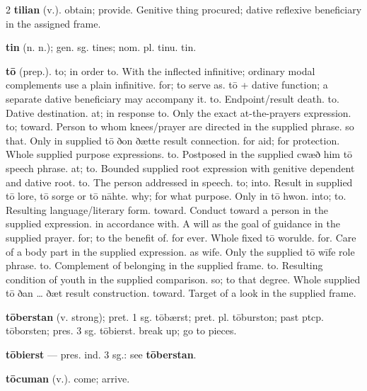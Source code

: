 \begin{multicols*}{2}
\textbf{tilian} (v.). obtain; provide. Genitive thing procured; dative reflexive beneficiary in the assigned frame.\par
\textbf{tin} (n. n.); gen. sg. tines; nom. pl. tinu. tin.\par
\textbf{tō} (prep.). to; in order to. With the inflected infinitive; ordinary modal complements use a plain infinitive. for; to serve as. tō + dative function; a separate dative beneficiary may accompany it. to. Endpoint/result death. to. Dative destination. at; in response to. Only the exact at-the-prayers expression. to; toward. Person to whom knees/prayer are directed in the supplied phrase. so that. Only in supplied tō ðon ðætte result connection. for aid; for protection. Whole supplied purpose expressions. to. Postposed in the supplied cwæð him tō speech phrase. at; to. Bounded supplied root expression with genitive dependent and dative root. to. The person addressed in speech. to; into. Result in supplied tō lore, tō sorge or tō nāhte. why; for what purpose. Only in tō hwon. into; to. Resulting language/literary form. toward. Conduct toward a person in the supplied expression. in accordance with. A will as the goal of guidance in the supplied prayer. for; to the benefit of. for ever. Whole fixed tō worulde. for. Care of a body part in the supplied expression. as wife. Only the supplied tō wīfe role phrase. to. Complement of belonging in the supplied frame. to. Resulting condition of youth in the supplied comparison. so; to that degree. Whole supplied tō ðan … ðæt result construction. toward. Target of a look in the supplied frame.\par
\textbf{tōberstan} (v. strong); pret. 1 sg. tōbærst; pret. pl. tōburston; past ptcp. tōborsten; pres. 3 sg. tōbierst. break up; go to pieces.\par
\textbf{tōbierst} — pres. ind. 3 sg.: see \textbf{tōberstan}.\par
\textbf{tōcuman} (v.). come; arrive.\par

\end{multicols*}
